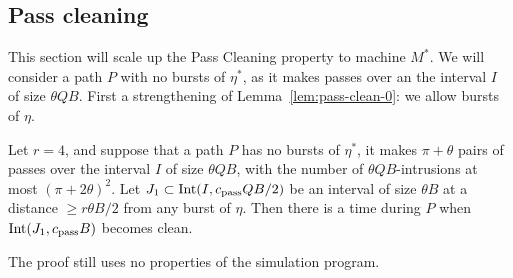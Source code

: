 \documentclass[11pt]{memoir}
\theoremstyle{definition} %
\renewcommand{\ge}{\geq}
\def\B{B}
\newcommand{\Int}{\mathrm{Int}}
\newcommand{\passno}{\pi}
\newcommand{\Q}{Q}
\newcommand{\cns}[1]{c_{\textrm{\upshape #1}}}
\newcommand{\CPass}{\cns{pass}}
\renewcommand{\r}{r} %
\begin{document}
\subsection{Pass cleaning}\label{sec:pass-cleaning}

This section will scale up the Pass Cleaning property to machine \( M^{*} \).
We will consider a path \( P \) with no bursts of \( \eta^{*} \), as
it makes passes over an the interval \( I \) of size \( \theta\Q\B \).
First a strengthening of Lemma~\ref{lem:pass-clean-0}: we allow bursts of \( \eta \).

\begin{lemma}\label{lem:pass-clean-1}
  Let \( \r = 4 \), and suppose that a
  path \( P \) has no bursts of \( \eta^{*} \), it makes \( \passno+\theta \) pairs of passes over
  the interval \( I \) of size \( \theta\Q\B \),
  with the number of \( \theta \Q\B \)-intrusions at most \( (\passno+2\theta)^{2} \).
  Let \( J_{1}\subset \Int(I,\CPass\Q\B/2 ) \) be an interval of size \( \theta\B \)
  at a distance \( \ge\r\theta\B/2 \) from any burst of \( \eta \).
  Then there is a time during \( P \) when \( \Int(J_{1},\CPass\B) \) becomes clean.
\end{lemma}
The proof still uses no properties of the simulation program.
\end{document}
